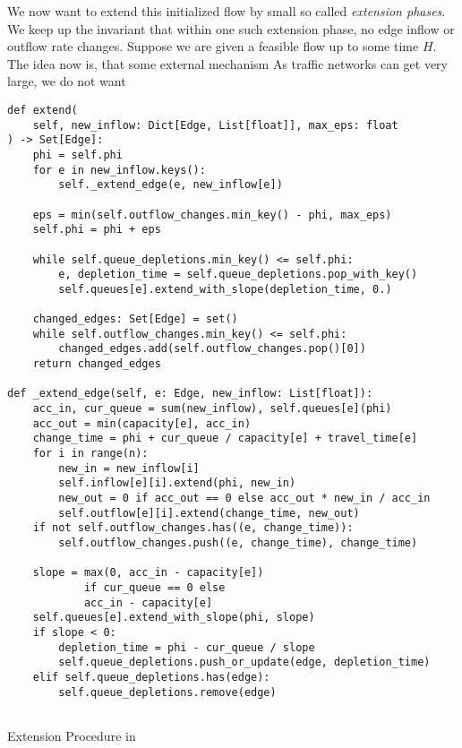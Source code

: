 We now want to extend this initialized flow by small so called \emph{extension phases}.
We keep up the invariant that within one such extension phase, no edge inflow or outflow rate changes.
Suppose we are given a feasible flow up to some time $H$.
The idea now is, that some external mechanism 
As traffic networks can get very large, we do not want 

\begin{algorithm}
    \begin{verbatim}
def extend(
    self, new_inflow: Dict[Edge, List[float]], max_eps: float
) -> Set[Edge]:
    phi = self.phi
    for e in new_inflow.keys():
        self._extend_edge(e, new_inflow[e])

    eps = min(self.outflow_changes.min_key() - phi, max_eps)
    self.phi = phi + eps

    while self.queue_depletions.min_key() <= self.phi:
        e, depletion_time = self.queue_depletions.pop_with_key()
        self.queues[e].extend_with_slope(depletion_time, 0.)
    
    changed_edges: Set[Edge] = set()
    while self.outflow_changes.min_key() <= self.phi:
        changed_edges.add(self.outflow_changes.pop()[0])
    return changed_edges

def _extend_edge(self, e: Edge, new_inflow: List[float]):
    acc_in, cur_queue = sum(new_inflow), self.queues[e](phi)
    acc_out = min(capacity[e], acc_in)
    change_time = phi + cur_queue / capacity[e] + travel_time[e]
    for i in range(n):
        new_in = new_inflow[i]
        self.inflow[e][i].extend(phi, new_in)
        new_out = 0 if acc_out == 0 else acc_out * new_in / acc_in
        self.outflow[e][i].extend(change_time, new_out)
    if not self.outflow_changes.has((e, change_time)):
        self.outflow_changes.push((e, change_time), change_time)

    slope = max(0, acc_in - capacity[e])
            if cur_queue == 0 else
            acc_in - capacity[e]
    self.queues[e].extend_with_slope(phi, slope)
    if slope < 0:
        depletion_time = phi - cur_queue / slope
        self.queue_depletions.push_or_update(edge, depletion_time)
    elif self.queue_depletions.has(edge):
        self.queue_depletions.remove(edge)


    \end{verbatim}
    \caption{Extension Procedure in }
\end{algorithm}

